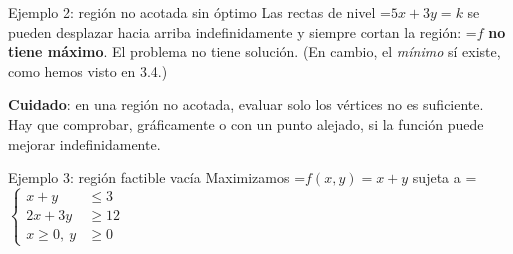 \documentclass[11pt,a4paper]{article}
\newcommand{\fmm}[1]{\setbox0=\hbox{$#1$}\ifdim\wd0>\linewidth\fmdisp{#1}\else\mbox{\box0}\fi}
\newcommand{\fmdisp}[1]{\[\setbox2=\hbox{$\displaystyle #1$}\ifdim\wd2>\linewidth\resizebox{\linewidth}{!}{\box2}\else\box2\fi\]}
\newcommand{\fmuline}[1]{\textbf{\color{fmaccent}#1}}
\begin{document}
\begin{fmex}{Ejemplo 2: región no acotada sin óptimo}
Las rectas de nivel \fmm{5x+3y=k} se pueden desplazar hacia arriba indefinidamente y siempre cortan la región: \fmm{f} \textbf{no tiene máximo}. El problema no tiene solución. (En cambio, el \emph{mínimo} sí existe, como hemos visto en 3.4.)

\begin{fmnote}\fmuline{Cuidado}: en una región no acotada, evaluar solo los vértices no es suficiente. Hay que comprobar, gráficamente o con un punto alejado, si la función puede mejorar indefinidamente.\end{fmnote}
\end{fmex}

\enlargethispage{\baselineskip}
\begin{fmex}{Ejemplo 3: región factible vacía}
Maximizamos \fmm{f(x,y)=x+y} sujeta a \fmm{\left\{\begin{aligned}x+y&\leq3\\ 2x+3y&\geq12\\ x\geq0,\ y&\geq0\end{aligned}\right.}


\end{fmex}
\end{document}
